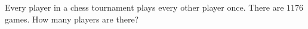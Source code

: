 Every player in a chess tournament plays every other player once. There are $1176$ games. How many players are there?
